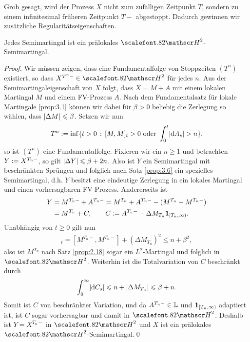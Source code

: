 Grob gesagt, wird der Prozess $X$ nicht zum zufälligen Zeitpunkt $T$, sondern zu
einem infinitesimal früheren Zeitpunkt $T-$ abgestoppt. Dadurch gewinnen wir
zusätzliche Regularitätseigenschaften.

\begin{theorem}
\label{prop:4.13}
Jedes Semimartingal ist ein prälokales $\cH^2$-Semimartingal.\fish
\end{theorem}
\begin{proof}
Wir müssen zeigen, dass eine Fundamentalfolge von Stoppzeiten $(T^n)$
existiert, so dass $X^{T^n-}\in \cH^2$ für jedes $n$. Aus der
Semimartingaleigenschaft von $X$ folgt, dass $X = M + A$ mit einem lokalen
Martingal $M$ und einem FV-Prozess $A$. Nach dem Fundamentalsatz für lokale
Martingale \ref{prop:3.1} können wir dabei für $\beta > 0$ beliebig die Zerlegung so
wählen, dass $\lvert\Delta M\rvert \leqslant \beta$. Setzen wir nun
\begin{align*}
T^n \defl \inf\setdef{t > 0}{[M,M]_t > 0 \text{ oder } \int_0^t \abs{\dA_s} >
n},
\end{align*}
so ist $(T^n)$ eine Fundamentalfolge. Fixieren wir ein $n\ge 1$ und betrachten
$Y := X^{T_n-}$, so gilt $\lvert\Delta Y\rvert \leqslant \beta + 2n$. Also ist $Y$
ein Semimartingal mit beschränkten Sprüngen und folglich nach Satz
\ref{prop:3.6} ein spezielles Semimartingal, d.h. $Y$ besitzt eine eindeutige
Zerlegung in ein lokales Martingal und einen vorhersagbaren FV Prozess.
Andererseits ist
\begin{align*}
Y &= M^{T_n-} + A^{T_n-} = M^{T_n} + A^{T_n-} - (M^{T_n}-M^{T_n-}) \\
&= M^{T_n}
+ C,\qquad C := A^{T_n-} - \Delta M_{T_n}\mathbf{1}_{[T_n,\infty)}.
\end{align*}
Unabhängig von $t\ge 0$ gilt nun
\begin{align*}
[M^{T_n},M^{T_n}]_t = 
[M^{T_n-},M^{T_n-}] + (\Delta M_{T_n})^2
\le n + \beta^2, 
\end{align*}
also ist $M^{T_n}$ nach Satz \ref{prop:2.18} sogar ein $L^2$-Martingal und
folglich in $\HH^2$. Weiterhin ist die Totalvariation von $C$ beschränkt durch
\begin{align*}
\int_0^\infty \lvert\mathrm{d} C_s\rvert \leqslant n + \lvert\Delta M_{T_n}\rvert \leqslant \beta + n.
\end{align*}
Somit ist $C$ von beschränkter Variation, und da $A^{T_n-}\in\mathbb{L}$ und
$\mathbf{1}_{[T_n,\infty)}$ adaptiert ist, ist $C$ sogar vorhersagbar und damit in
$\HH^2$. Deshalb ist $Y = X^{T_n-}$ in $\HH^2$ und $X$ ist ein prälokales
$\HH^2$-Semimartingal.\qed
\end{proof}

